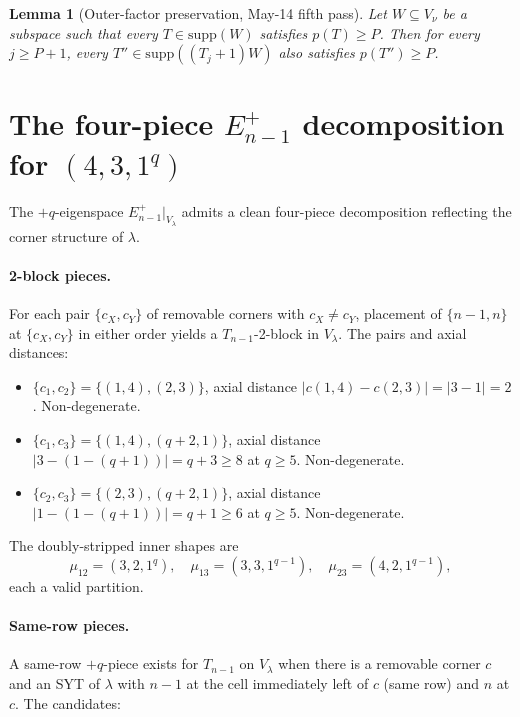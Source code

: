 \documentclass[11pt]{article}
\newtheorem{lemma}[theorem]{Lemma}
\theoremstyle{definition}
\newcommand{\supp}{\mathrm{supp}}
\begin{document}
\begin{lemma}[Outer-factor preservation, May-14 fifth pass]\label{lem:outer-preserve}
Let $W \subseteq V_\nu$ be a subspace such that every $T \in \supp(W)$
satisfies $p(T) \ge P$.  Then for every $j \ge P + 1$,
every $T'' \in \supp((T_j{+}1) W)$ also satisfies $p(T'') \ge P$.
\end{lemma}

\section{The four-piece $E^+_{n-1}$ decomposition for $(4,3,1^q)$}\label{sec:Eplus}

The $+q$-eigenspace $E_{n-1}^+|_{V_\lambda}$ admits a clean
four-piece decomposition reflecting the corner structure of $\lambda$.

\paragraph{2-block pieces.}  For each pair $\{c_X, c_Y\}$ of removable
corners with $c_X \ne c_Y$, placement of $\{n-1, n\}$ at $\{c_X, c_Y\}$
in either order yields a $T_{n-1}$-2-block in $V_\lambda$.  The pairs
and axial distances:

\begin{itemize}[topsep=0.2em,itemsep=0.1em]
\item $\{c_1, c_2\} = \{(1, 4), (2, 3)\}$, axial distance
$|c(1,4) - c(2,3)| = |3 - 1| = 2$.  Non-degenerate.
\item $\{c_1, c_3\} = \{(1, 4), (q+2, 1)\}$, axial distance
$|3 - (1 - (q+1))| = q + 3 \ge 8$ at $q \ge 5$.  Non-degenerate.
\item $\{c_2, c_3\} = \{(2, 3), (q+2, 1)\}$, axial distance
$|1 - (1 - (q+1))| = q + 1 \ge 6$ at $q \ge 5$.  Non-degenerate.
\end{itemize}

The doubly-stripped inner shapes are
\[
   \mu_{12} = (3, 2, 1^q), \quad
   \mu_{13} = (3, 3, 1^{q-1}), \quad
   \mu_{23} = (4, 2, 1^{q-1}),
\]
each a valid partition.

\paragraph{Same-row pieces.}  A same-row $+q$-piece exists for
$T_{n-1}$ on $V_\lambda$ when there is a removable corner $c$ and an
SYT of $\lambda$ with $n-1$ at the cell immediately left of $c$ (same
row) and $n$ at $c$.  The candidates:
\end{document}
